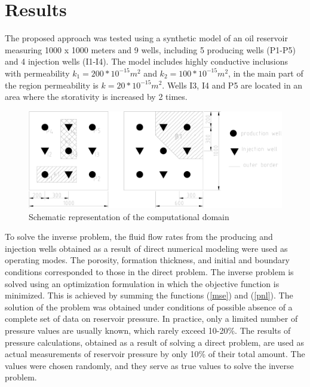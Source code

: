 \documentclass[
11pt,%
tightenlines,%
twoside,%
onecolumn,%
nofloats,%
nobibnotes,%
nofootinbib,%
superscriptaddress,%
noshowpacs,%
centertags]%
{revtex4}
\begin{document}
\section{Results}

The proposed approach was tested using a synthetic model of an oil reservoir measuring 1000 x 1000 meters and 9 wells, including 5 producing wells (P1-P5) and 4 injection wells (I1-I4). The model includes highly conductive inclusions with permeability $k_1 = 200*10^{-15} m^2$ and $k_2 = 100*10^{-15} m^2$, in the main part of the region permeability is $k = 20*10^{-15}  m^2$. Wells I3, I4 and P5 are located in an area where the storativity is increased by 2 times.

\begin{figure}
	\centering
	\includegraphics[width=0.7\linewidth]{images/fig2.eps}
	\caption{Schematic representation of the computational domain}
	\label{fig:schime}
\end{figure}

To solve the inverse problem, the fluid flow rates from the producing and injection wells obtained as a result of direct numerical modeling were used as operating modes. The porosity, formation thickness, and initial and boundary conditions corresponded to those in the direct problem.
The inverse problem is solved using an optimization formulation in which the objective function is minimized. This is achieved by summing the functions (\ref{mse}) and (\ref{pnl}).
The solution of the problem was obtained under conditions of possible absence of a complete set of data on reservoir pressure.
In practice, only a limited number of pressure values are usually known, which rarely exceed 10-20\%. The results of pressure calculations, obtained as a result of solving a direct problem, are used as actual measurements of reservoir pressure by only 10\% of their total amount. The values were chosen randomly, and they serve as true values to solve the inverse problem.
\end{document}
